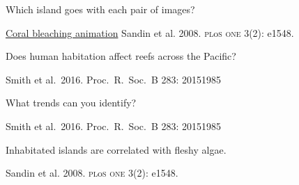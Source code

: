 \documentclass[t,handout]{beamer}  %
\begin{document}
{
\begin{frame}[b]{Which island goes with each pair of images?}


	\tiny {}\href{http://coralreefwatch.noaa.gov/satellite/baa.php}{Coral bleaching animation} \hfill \onslide<1->\tiny Sandin et al. 2008. \textsc{pl}o\textsc{s one} 3(2): e1548.

\end{frame}
}
%
%
{
\begin{frame}[b]{Does human habitation affect reefs across the Pacific?}

	\hfill \tiny Smith et al.~2016. Proc.~R.~Soc.~B 283: 20151985

\end{frame}
}
%
{
\begin{frame}[b]

	\hfill {}

\end{frame}
}
%
{
\begin{frame}[b]{What trends can you identify?}

	\hfill \tiny Smith et al.~2016. Proc.~R.~Soc.~B 283: 20151985

\end{frame}
}
%
{
\begin{frame}[b]{Inhabitated islands are correlated with fleshy algae.}

	\hfill \tiny {}

\end{frame}
}
%
{
\begin{frame}[b]

	\hfill \tiny Sandin et al. 2008. \textsc{pl}o\textsc{s one} 3(2): e1548.

\end{frame}
}
\end{document}
